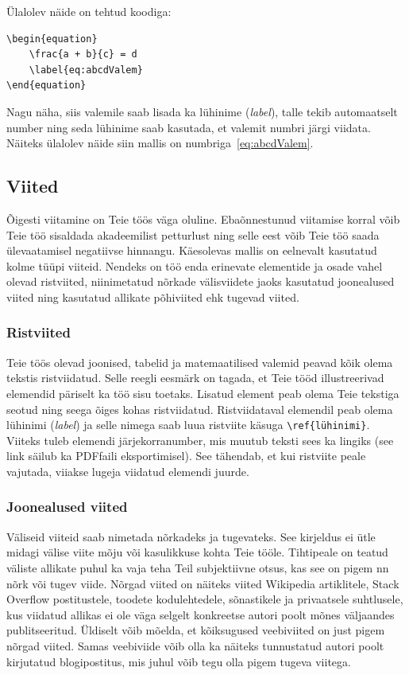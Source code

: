 Ülalolev näide on tehtud koodiga:
\begin{verbatim}
\begin{equation}
    \frac{a + b}{c} = d
    \label{eq:abcdValem}
\end{equation}
\end{verbatim}

Nagu näha, siis valemile saab lisada ka lühinime (\emph{label}), talle tekib automaatselt number ning seda lühinime saab kasutada, et valemit numbri järgi viidata. Näiteks ülalolev näide siin mallis on numbriga~\ref{eq:abcdValem}.

\subsection{Viited}
Õigesti viitamine on Teie töös väga oluline. Ebaõnnestunud viitamise korral võib Teie töö sisaldada akadeemilist petturlust ning selle eest võib Teie töö saada ülevaatamisel negatiivse hinnangu. Käesolevas mallis on eelnevalt kasutatud kolme tüüpi viiteid. Nendeks on töö enda erinevate elementide ja osade vahel olevad ristviited, niinimetatud nõrkade välisviidete jaoks kasutatud joonealused viited ning kasutatud allikate põhiviited ehk tugevad viited.

\subsubsection{Ristviited}
Teie töös olevad joonised, tabelid ja matemaatilised valemid peavad kõik olema tekstis ristviidatud. Selle reegli eesmärk on tagada, et Teie tööd illustreerivad elemendid päriselt ka töö sisu toetaks. Lisatud element peab olema Teie tekstiga seotud ning seega õiges kohas ristviidatud. Ristviidataval elemendil peab olema lühinimi (\emph{label}) ja selle nimega saab luua ristviite käsuga \verb|\ref{lühinimi}|. Viiteks tuleb elemendi järjekorranumber, mis muutub teksti sees ka lingiks (see link säilub ka PDF{}faili eksportimisel). See tähendab, et kui ristviite peale vajutada, viiakse lugeja viidatud elemendi juurde.

\subsubsection{Joonealused viited}
Väliseid viiteid saab nimetada nõrkadeks ja tugevateks. See kirjeldus ei ütle midagi välise viite mõju või kasulikkuse kohta Teie tööle. Tihtipeale on teatud väliste allikate puhul ka vaja teha Teil subjektiivne otsus, kas see on pigem nn nõrk või tugev viide. Nõrgad viited on näiteks viited Wikipedia artiklitele, Stack Overflow postitustele, toodete kodulehtedele, sõnastikele ja privaatsele suhtlusele, kus viidatud allikas ei ole väga selgelt konkreetse autori poolt mõnes väljaandes publitseeritud. Üldiselt võib mõelda, et kõiksugused veebiviited on just pigem nõrgad viited. Samas veebiviide võib olla ka näiteks tunnustatud autori poolt kirjutatud blogipostitus, mis juhul võib tegu olla pigem tugeva viitega.

